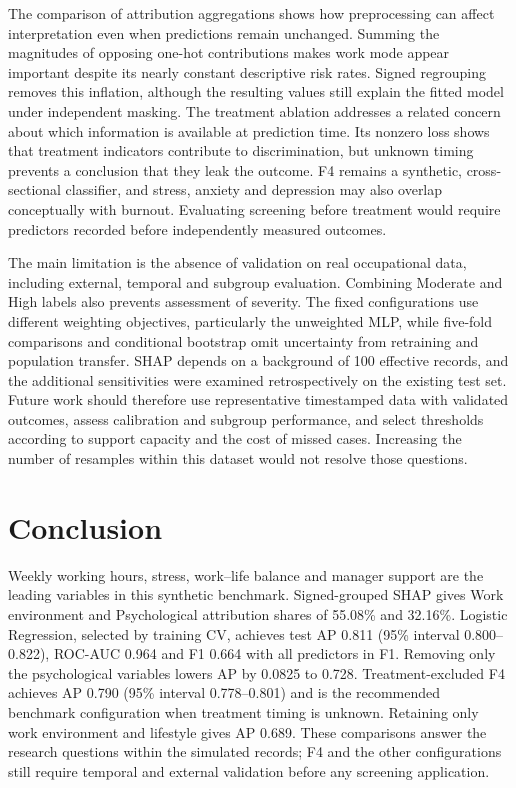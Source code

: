 \documentclass[runningheads]{llncs}
\begin{document}
The comparison of attribution aggregations shows how preprocessing can affect interpretation even when predictions remain unchanged. Summing the magnitudes of opposing one-hot contributions makes work mode appear important despite its nearly constant descriptive risk rates. Signed regrouping removes this inflation, although the resulting values still explain the fitted model under independent masking. The treatment ablation addresses a related concern about which information is available at prediction time. Its nonzero loss shows that treatment indicators contribute to discrimination, but unknown timing prevents a conclusion that they leak the outcome. F4 remains a synthetic, cross-sectional classifier, and stress, anxiety and depression may also overlap conceptually with burnout. Evaluating screening before treatment would require predictors recorded before independently measured outcomes.

The main limitation is the absence of validation on real occupational data, including external, temporal and subgroup evaluation. Combining Moderate and High labels also prevents assessment of severity. The fixed configurations use different weighting objectives, particularly the unweighted MLP, while five-fold comparisons and conditional bootstrap omit uncertainty from retraining and population transfer. SHAP depends on a background of 100 effective records, and the additional sensitivities were examined retrospectively on the existing test set. Future work should therefore use representative timestamped data with validated outcomes, assess calibration and subgroup performance, and select thresholds according to support capacity and the cost of missed cases. Increasing the number of resamples within this dataset would not resolve those questions.

\FloatBarrier
\section{Conclusion}
Weekly working hours, stress, work--life balance and manager support are the leading variables in this synthetic benchmark. Signed-grouped SHAP gives Work environment and Psychological attribution shares of 55.08\% and 32.16\%. Logistic Regression, selected by training CV, achieves test AP 0.811 (95\% interval 0.800--0.822), ROC-AUC 0.964 and F1 0.664 with all predictors in F1. Removing only the psychological variables lowers AP by 0.0825 to 0.728. Treatment-excluded F4 achieves AP 0.790 (95\% interval 0.778--0.801) and is the recommended benchmark configuration when treatment timing is unknown. Retaining only work environment and lifestyle gives AP 0.689. These comparisons answer the research questions within the simulated records; F4 and the other configurations still require temporal and external validation before any screening application.
\end{document}
